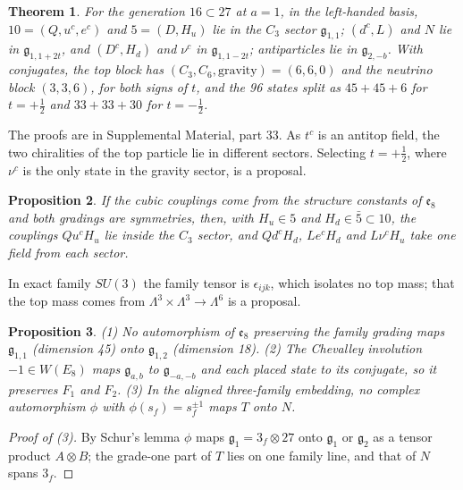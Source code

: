 \documentclass[aps,prd,reprint,onecolumn,nofootinbib,amsmath,amssymb,floatfix]{revtex4-2}
\theoremstyle{plain}
\newtheorem{theorem}{Theorem}
\newtheorem{proposition}[theorem]{Proposition}
\newcommand{\supp}[1]{Supplemental Material, part #1}
\begin{document}
\begin{theorem}\label{thm:placement}
For the generation $16\subset27$ at $a=1$, in the left-handed basis, $10=(Q,u^c,e^c)$ and $5=(D,H_u)$ lie in the $C_3$ sector $\mathfrak g_{1,1}$; $(d^c,L)$ and $N$ lie in $\mathfrak g_{1,1+2t}$, and $(D^c,H_d)$ and $\nu^c$ in $\mathfrak g_{1,1-2t}$; antiparticles lie in $\mathfrak g_{2,-b}$. With conjugates, the top block has $(C_3,C_6,\text{gravity})=(6,6,0)$ and the neutrino block $(3,3,6)$, for both signs of $t$, and the 96 states split as $45+45+6$ for $t=+\frac12$ and $33+33+30$ for $t=-\frac12$.
\end{theorem}

The proofs are in \supp{33}. As $t^c$ is an antitop field, the two chiralities of the top particle lie in different sectors. Selecting $t=+\frac12$, where $\nu^c$ is the only state in the gravity sector, is a proposal.

\begin{proposition}\label{prop:yukawa}
If the cubic couplings come from the structure constants of $\mathfrak e_8$ and both gradings are symmetries, then, with $H_u\in5$ and $H_d\in\bar5\subset10$, the couplings $Qu^cH_u$ lie inside the $C_3$ sector, and $Qd^cH_d$, $Le^cH_d$ and $L\nu^cH_u$ take one field from each sector.
\end{proposition}

In exact family $SU(3)$ the family tensor is $\epsilon_{ijk}$, which isolates no top mass; that the top mass comes from $\Lambda^3\times\Lambda^3\to\Lambda^6$ is a proposal.

\begin{proposition}\label{prop:chevalley}
(1) No automorphism of $\mathfrak e_8$ preserving the family grading maps $\mathfrak g_{1,1}$ (dimension 45) onto $\mathfrak g_{1,2}$ (dimension 18). (2) The Chevalley involution $-1\in W(E_8)$ maps $\mathfrak g_{a,b}$ to $\mathfrak g_{-a,-b}$ and each placed state to its conjugate, so it preserves $F_1$ and $F_2$. (3) In the aligned three-family embedding, no complex automorphism $\phi$ with $\phi(s_f)=s_f^{\pm1}$ maps $T$ onto $N$.
\end{proposition}

\begin{proof}[Proof of (3)]
By Schur's lemma $\phi$ maps $\mathfrak g_1=3_f\otimes27$ onto $\mathfrak g_1$ or $\mathfrak g_2$ as a tensor product $A\otimes B$; the grade-one part of $T$ lies on one family line, and that of $N$ spans $3_f$.
\end{proof}
\end{document}
